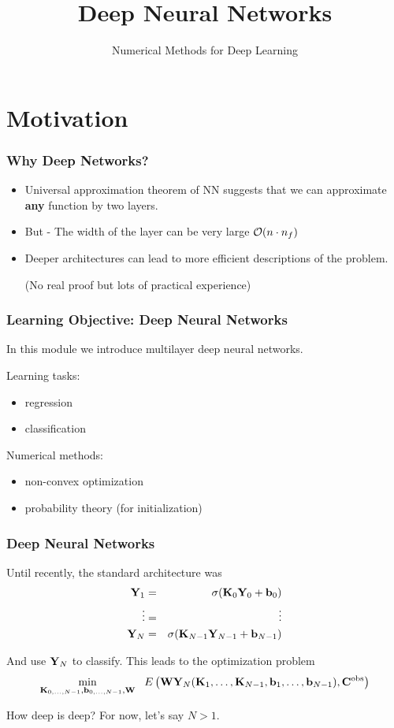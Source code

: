\documentclass[12pt,fleqn]{beamer}
\date{}
\title{Deep Neural Networks}
\subtitle{Numerical Methods for Deep Learning}
\begin{document}
\makebeamertitle

\section{Motivation} %
\label{sec:motivation}
\begin{frame}[fragile]\frametitle{Why Deep Networks?}

\begin{itemize}
\item Universal approximation theorem of NN suggests that we can approximate {\bf any} function by
two layers.
\item But - The width of the layer can be very large ${\cal O}(n\cdot n_f)$
\item
Deeper architectures can lead to more efficient descriptions of the problem.

(No real proof but lots of practical experience)
\end{itemize}

\end{frame}





\begin{frame}
	\frametitle{Learning Objective: Deep Neural Networks}
	
	In this module we introduce multilayer deep neural networks.
	
	\bigskip
	
	Learning tasks:
	\begin{itemize}
		\item regression
		\item classification
	\end{itemize}
	
	\bigskip
	
	Numerical methods:
	\begin{itemize}
		\item non-convex optimization
		\item probability theory (for initialization)
	\end{itemize}
\end{frame}


\begin{frame}[fragile]\frametitle{Deep Neural Networks}


Until recently, the standard architecture was
\begin{eqnarray*}
{\bf Y}_1 &=& \sigma({\bf K}_0{\bf Y}_0 + {\bf b}_0) \\
\vdots & =&  \vdots \\
 {\bf Y}_N &=& \sigma({\bf K}_{N-1}  {\bf Y}_{N-1}+ {\bf b}_{N-1})
 \end{eqnarray*}

\bigskip
\pause

And use ${\bf Y}_N$ to classify. This leads to the optimization problem
$$ 
\min_{{\bf K}_{0,\ldots,N-1},{\bf b}_{0,\ldots,N-1},{\bf W}} \ \ E\left({\bf W} {\bf Y}_N({\bf K}_1,\ldots,{\bf K}_{N-1},{\bf b}_1,\ldots, {\bf b}_{N-1}) , {\bf C}^{\rm obs} \right)
 $$

\pause

\bigskip

How deep is deep? For now, let's say $N>1$.
\end{frame}
\end{document}
